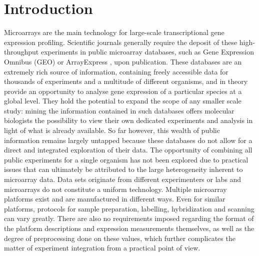 
\section{Introduction}

Microarrays are the main technology for large-scale transcriptional gene expression profiling. Scientific journals generally require the deposit of these high-throughput experiments in public microarray databases, such as Gene Expression Omnibus (GEO) \cite{Barrett2011} or ArrayExpress \cite{Parkinson2009}, upon publication. These databases are an extremely rich source of information, containing freely accessible data for thousands of experiments and a multitude of different organisms, and in theory provide an opportunity to analyse gene expression of a particular species at a global level. They hold the potential to expand the scope of any smaller scale study: mining the information contained in such databases offers molecular biologists the possibility to view their own dedicated experiments and analysis in light of what is already available. So far however, this wealth of public information remains largely untapped because these databases do not allow for a direct and integrated exploration of their data. The opportunity of combining all public experiments for a single organism has not been explored due to practical issues that can ultimately be attributed to the large heterogeneity inherent to microarray data. Data sets originate from different experimenters or labs and microarrays do not constitute a uniform technology. Multiple microarray platforms exist and are manufactured in different ways. Even for similar platforms, protocols for sample preparation, labelling, hybridization and scanning can vary greatly. There are also no requirements imposed \cite{Brazma2009, Brazma2001} regarding the format of the platform descriptions and expression measurements themselves, as well as the degree of preprocessing done on these values, which further complicates the matter of experiment integration from a practical point of view.

